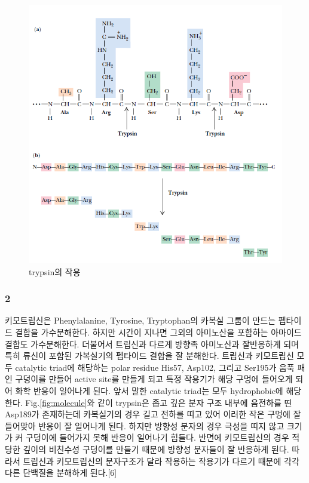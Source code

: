 \documentclass[%
 reprint,
 amsmath,amssymb,
 aps,
]{revtex4-2}
\begin{document}
\begin{figure}[htbp]
	\includegraphics[width = 0.9\linewidth]{trypsin.png}%
	\caption{\label{fig:trypsin}trypsin의 작용}
\end{figure}

\subsubsection{\label{sec:level3} 2}
키모트립신은 Phenylalanine, Tyrosine, Tryptophan의 카복실 그룹이 만드는 펩타이드 결합을 가수분해한다. 하지만 시간이 지나면 그외의 아미노산을 포함하는 아마이드 결합도 가수분해한다. 더불어서 트립신과 다르게 방향족 아미노산과 잘반응하게 되며 특히 류신이 포함된 가복실기의 펩타이드 결합을 잘 분해한다. 트립신과 키모트립신 모두 catalytic triad에 해당하는 polar residue His57, Asp102, 그리고 Ser195가 움푹 패인 구덩이를 만들어 active site를 만들게 되고 특정 작용기가 해당 구멍에 들어오게 되어 화학 반응이 일어나게 된다. 앞서 말한 catalytic triad는 모두 hydrophobic에 해당한다. Fig.\ref{fig:molecule}와 같이 trypsin은 좁고 깊은 분자 구조 내부에 음전하를 띤 Asp189가 존재하는데 카복실기의 경우 길고 전하를 띠고 있어 이러한 작은 구멍에 잘 들어맞아 반응이 잘 일어나게 된다. 하지만 방향성 분자의 경우 극성을 띠지 않고 크기가 커 구덩이에 들어가지 못해 반응이 일어나기 힘들다. 반면에 키모트립신의 경우 적당한 깊이의 비친수성 구덩이를 만들기 때문에 방향성 분자들이 잘 반응하게 된다. 따라서 트립신과 키모트립신의 분자구조가 달라 작용하는 작용기가 다르기 때문에 각각 다른 단백질을 분해하게 된다.[6]
\end{document}
